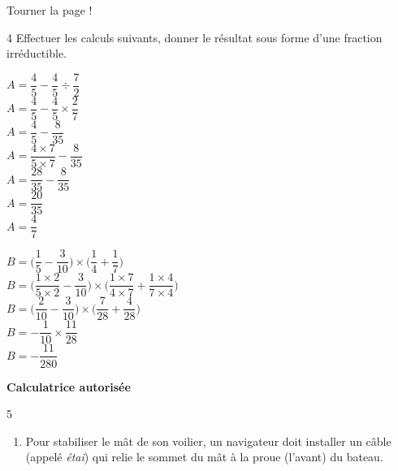 \documentclass[a4paper]{book}
\begin{document}
{\vfill
\hfill Tourner la page !


\newpage


    \begin{exerciceNote}{4}
        Effectuer les calculs suivants, donner le résultat sous forme d'une fraction irréductible.

        \begin{minipage}{0.45\linewidth}
            $A = \dfrac{4}{5}-\dfrac{4}{5}\div\dfrac{7}{2}$\\[2ex]
            $A = \dfrac{4}{5}-\dfrac{4}{5}\times\dfrac{2}{7}$\\[2ex]
            $A = \dfrac{4}{5}-\dfrac{8}{35}$\\[2ex]
            $A = \dfrac{4\times7}{5\times7}-\dfrac{8}{35}$\\[2ex]
            $A = \dfrac{28}{35}-\dfrac{8}{35}$\\[2ex]
            $A = \dfrac{20}{35}$\\[2ex]
            $A = \dfrac{4}{7}$\\[2ex]
        \end{minipage}
        \hfill\vline\hfill
        \begin{minipage}{0.45\linewidth}
            $B = \bigg(\dfrac{1}{5}-\dfrac{3}{10}\bigg)\times\bigg(\dfrac{1}{4}+\dfrac{1}{7}\bigg)$\\ [2ex]
            $B = \bigg(\dfrac{1\times2}{5\times2}-\dfrac{3}{10}\bigg)\times\bigg(\dfrac{1\times7}{4\times7}+\dfrac{1\times4}{7\times4}\bigg)$\\ [2ex]
            $B = \bigg(\dfrac{2}{10}-\dfrac{3}{10}\bigg)\times\bigg(\dfrac{7}{28}+\dfrac{4}{28}\bigg)$\\ [2ex]
            $B = -\dfrac{1}{10}\times\dfrac{11}{28}$\\ [2ex]
            $B = -\dfrac{11}{280}$
        \end{minipage}   
    \end{exerciceNote}


\newpage


\textbf{Calculatrice autorisée}

    \begin{exerciceNote}{5}
        \begin{enumerate}[leftmargin=*]
            \item Pour stabiliser le mât de son voilier, un navigateur doit installer un câble (appelé \textit{étai}) qui relie le sommet du mât à la proue (l'avant) du bateau.
            

\end{enumerate}
\end{exerciceNote}}
\end{document}
